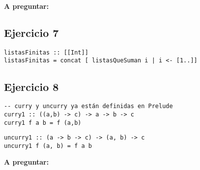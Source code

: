 \textbf{A preguntar:}
%
%
%
%
\subsection{Ejercicio 7}

\begin{centrado}
	\begin{verbatim}
listasFinitas :: [[Int]]
listasFinitas = concat [ listasQueSuman i | i <- [1..]]
\end{verbatim}
\end{centrado}	

\subsection{Ejercicio 8}
\begin{centrado}
	\begin{verbatim}
-- curry y uncurry ya están definidas en Prelude
curry1 :: ((a,b) -> c) -> a -> b -> c
curry1 f a b = f (a,b)
	\end{verbatim}
\end{centrado}

\begin{centrado}
\begin{verbatim}
uncurry1 :: (a -> b -> c) -> (a, b) -> c
uncurry1 f (a, b) = f a b
	\end{verbatim}
\end{centrado}

\textbf{A preguntar:} %

